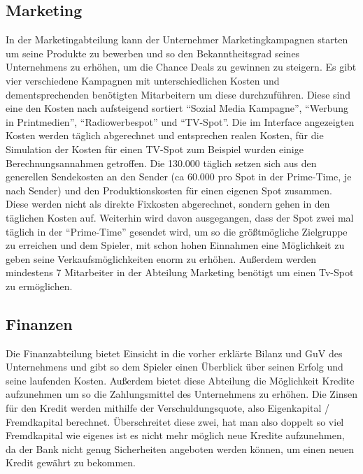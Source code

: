 \subsection{Marketing}
In der Marketingabteilung kann der Unternehmer Marketingkampagnen starten um seine Produkte zu bewerben und so den Bekanntheitsgrad seines Unternehmens zu erhöhen, um die Chance Deals zu gewinnen zu steigern. Es gibt vier verschiedene Kampagnen mit unterschiedlichen Kosten und dementsprechenden benötigten Mitarbeitern um diese durchzuführen. Diese sind eine den Kosten nach aufsteigend sortiert \enquote{Sozial Media Kampagne}, \enquote{Werbung in Printmedien}, \enquote{Radiowerbespot} und \enquote{TV-Spot}. Die im Interface angezeigten Kosten werden täglich abgerechnet und entsprechen realen Kosten, für die Simulation der Kosten für einen TV-Spot zum Beispiel wurden einige Berechnungsannahmen getroffen. Die 130.000 \€ täglich setzen sich aus den generellen Sendekosten an den Sender (ca 60.000 pro Spot in der Prime-Time, je nach Sender) und den Produktionskosten für einen eigenen Spot zusammen. Diese werden nicht als direkte Fixkosten abgerechnet, sondern gehen in den täglichen Kosten auf. Weiterhin wird davon ausgegangen, dass der Spot zwei mal täglich in der \enquote{Prime-Time} gesendet wird, um so die größtmögliche Zielgruppe zu erreichen und dem Spieler, mit schon hohen Einnahmen eine Möglichkeit zu geben seine Verkaufsmöglichkeiten enorm zu erhöhen. Außerdem werden mindestens 7 Mitarbeiter in der Abteilung Marketing benötigt um einen Tv-Spot zu ermöglichen. 

\subsection{Finanzen}
Die Finanzabteilung bietet Einsicht in die vorher erklärte Bilanz und GuV des Unternehmens und gibt so dem Spieler einen Überblick über seinen Erfolg und seine laufenden Kosten. Außerdem bietet diese Abteilung die Möglichkeit Kredite aufzunehmen um so die Zahlungsmittel des Unternehmens zu erhöhen. Die Zinsen für den Kredit werden mithilfe der Verschuldungsquote, also Eigenkapital / Fremdkapital berechnet. Überschreitet diese zwei, hat man also doppelt so viel Fremdkapital wie eigenes ist es nicht mehr möglich neue Kredite aufzunehmen, da der Bank nicht genug Sicherheiten angeboten werden können, um einen neuen Kredit gewährt zu bekommen.

